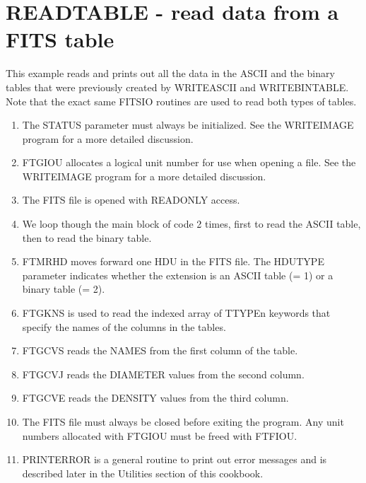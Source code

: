 \section{READTABLE - read data from a FITS table}

This example reads and prints out all the data in the ASCII and
the binary tables that were previously created by WRITEASCII and
WRITEBINTABLE.  Note that the exact same FITSIO routines are
used to read both types of tables.

\begin{enumerate}
\item
The STATUS parameter must always be initialized.  See the WRITEIMAGE 
program for a more detailed discussion.
\item
FTGIOU allocates a logical unit number for use when opening a file.
See the WRITEIMAGE program for a more detailed discussion.
\item
The FITS file is opened with READONLY access.
\item
We loop though the main block of code 2 times, first to read
the ASCII table, then to read the binary table.
\item
FTMRHD moves forward one HDU in the FITS file.  The HDUTYPE parameter
indicates whether the extension is an ASCII table (= 1) or a 
binary table (= 2).
\item
FTGKNS is used to read the indexed array of TTYPEn keywords that
specify the names of the columns in the tables.
\item
FTGCVS reads the NAMES from the first column of the table.
\item
FTGCVJ reads the DIAMETER values from the second column.
\item
FTGCVE reads the DENSITY values from the third column.
\item
The FITS file must always be closed before exiting the program. 
Any unit numbers allocated with FTGIOU must be freed with FTFIOU.
\item
PRINTERROR is a general routine to print out error messages and is
described later in the Utilities section of this cookbook.

\end{enumerate}
\newpage
\footnotesize
